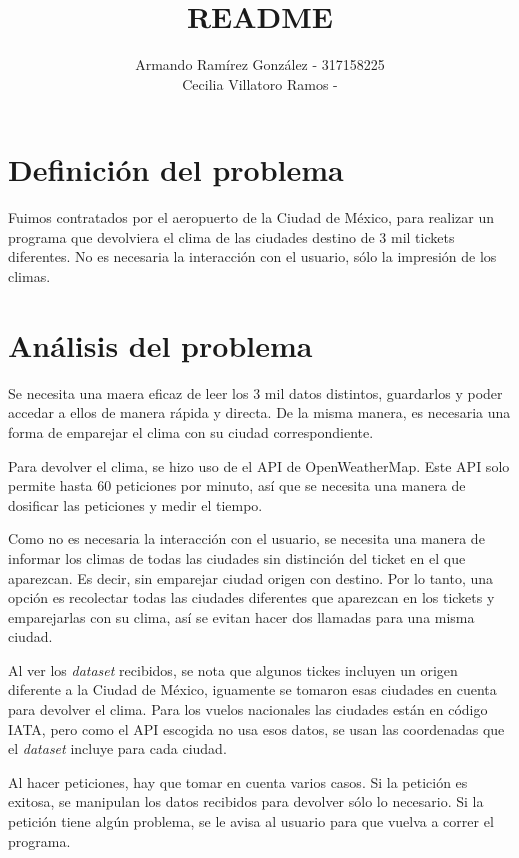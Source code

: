 \documentclass[]{article}
\title{README}
\author{Armando Ramírez González - 317158225 \\ Cecilia Villatoro Ramos - }
\begin{document}
\maketitle

\section{Definición del problema}

Fuimos contratados por el aeropuerto de la Ciudad de México, para realizar un programa que devolviera el clima de las ciudades destino de 3 mil tickets diferentes. No es necesaria la interacción con el usuario, sólo la impresión de los climas.

\section{Análisis del problema}

Se necesita una maera eficaz de leer los 3 mil datos distintos, guardarlos y 
poder accedar a ellos de manera rápida y directa. De la misma manera, es 
necesaria una forma de emparejar el clima con su ciudad correspondiente.

Para devolver el clima, se hizo uso de el API de OpenWeatherMap. Este API
solo permite hasta 60 peticiones por minuto, así que se necesita una 
manera de dosificar las peticiones y medir el tiempo.

Como no es necesaria la interacción con el usuario, se necesita 
una manera de informar los climas de todas las ciudades sin distinción del 
ticket en el que aparezcan. Es decir, sin emparejar ciudad origen con 
destino. Por lo tanto, una opción es recolectar todas las ciudades 
diferentes que aparezcan en los tickets y emparejarlas con su clima, así 
se evitan hacer dos llamadas para una misma ciudad.

Al ver los \emph{dataset} recibidos, se nota que algunos tickes incluyen 
un origen diferente a la Ciudad de México, iguamente se tomaron esas 
ciudades en cuenta para devolver el clima. Para los vuelos nacionales las 
ciudades están en código IATA, pero como el API escogida no usa esos 
datos, se usan las coordenadas que el \emph{dataset} incluye para cada 
ciudad. 

Al hacer peticiones, hay que tomar en cuenta varios casos. Si la petición 
es exitosa, se manipulan los datos recibidos para devolver sólo lo 
necesario. Si la petición tiene algún problema, se le avisa al usuario para 
que vuelva a correr el programa. 
\end{document}
